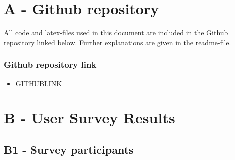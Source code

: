 

\chapter*{A - Github repository}

All code and latex-files used in this document are included in the Github repository linked below. Further explanations are given in the readme-file. 


\subsection*{Github repository link}
\begin{itemize}
    \item \url{GITHUBLINK}
\end{itemize}




\chapter*{B - User Survey Results}

\label{appendix:user_survey}
\renewcommand{\thefigure}{B.\arabic{figure}}
\setcounter{figure}{0}
\renewcommand{\thetable}{B.\arabic{table}}
\setcounter{table}{0}

\section*{\large{B1 - Survey participants}}
\vspace*{1cm}

